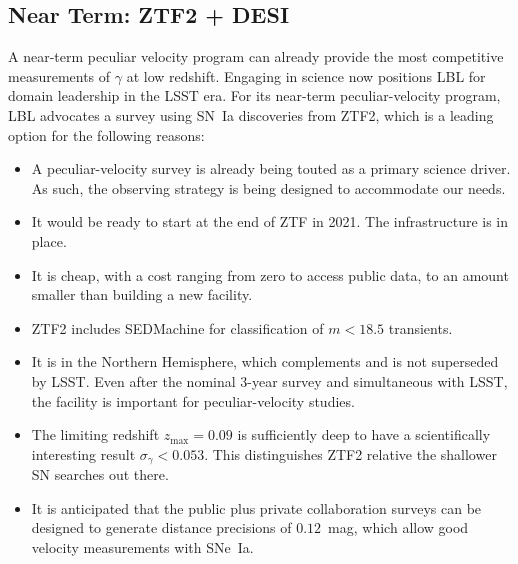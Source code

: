 \documentclass[11pt, oneside]{article}   	%
\begin{document}
\subsection{Near Term: ZTF2 + DESI}
A near-term peculiar velocity program can already provide the most competitive measurements of $\gamma$ at low redshift.  Engaging in science
now positions LBL for domain leadership in the LSST era.  For its near-term peculiar-velocity program, LBL advocates a survey using SN~Ia discoveries from ZTF2,
which is a leading option for the following reasons:
\begin{itemize}
\item A peculiar-velocity survey is already being touted as a primary science driver. As such,
the observing strategy is being designed to accommodate our needs.
\item It would be ready to start at the end of ZTF in 2021.   The infrastructure is in place.
\item It is cheap, with a cost ranging from zero to access public data, to an amount smaller
than building a new facility.
\item ZTF2 includes SEDMachine for classification of $m<18.5$ transients.
\item It is in the Northern Hemisphere, which complements and is not superseded by LSST. 
Even after the nominal 3-year survey and simultaneous with LSST, the facility is important for peculiar-velocity studies.
\item The limiting redshift $z_{\text{max}} =0.09$ is sufficiently deep  to have a scientifically interesting result $\sigma_\gamma < 0.053$.
This distinguishes ZTF2 relative the shallower SN searches out there.
\item It is anticipated that the public plus private collaboration surveys can be designed to generate distance
precisions of $0.12$~mag, which allow good velocity measurements with SNe~Ia.
\end{itemize}
\end{document}
